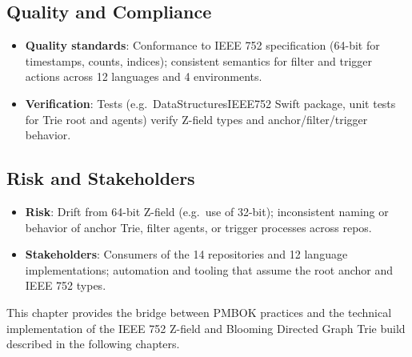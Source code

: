 \subsection{Quality and Compliance}

\begin{itemize}
    \item \textbf{Quality standards}: Conformance to IEEE 752 specification (64-bit for timestamps, counts, indices); consistent semantics for filter and trigger actions across 12 languages and 4 environments.
    \item \textbf{Verification}: Tests (e.g.\ DataStructuresIEEE752 Swift package, unit tests for Trie root and agents) verify Z-field types and anchor/filter/trigger behavior.
\end{itemize}

\subsection{Risk and Stakeholders}

\begin{itemize}
    \item \textbf{Risk}: Drift from 64-bit Z-field (e.g.\ use of 32-bit); inconsistent naming or behavior of anchor Trie, filter agents, or trigger processes across repos.
    \item \textbf{Stakeholders}: Consumers of the 14 repositories and 12 language implementations; automation and tooling that assume the root anchor and IEEE 752 types.
\end{itemize}

This chapter provides the bridge between PMBOK practices and the technical implementation of the IEEE 752 Z-field and Blooming Directed Graph Trie build described in the following chapters.
